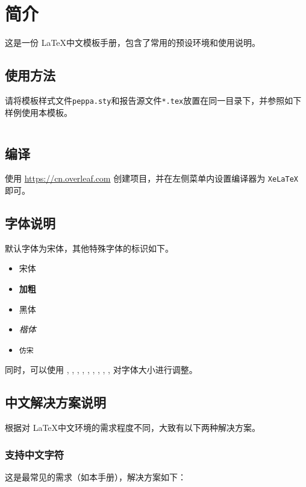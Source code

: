 \section{简介}

这是一份 \LaTeX 中文模板手册，包含了常用的预设环境和使用说明。

\subsection{使用方法}

请将模板样式文件\texttt{peppa.sty}和报告源文件\texttt{*.tex}放置在同一目录下，并参照如下样例使用本模板。

\inputminted{latex}{src/template-usage.tex}

\subsection{编译}
使用 \url{https://cn.overleaf.com} 创建项目，并在左侧菜单内设置编译器为 \texttt{XeLaTeX} 即可。

\subsection{字体说明}
默认字体为宋体，其他特殊字体的标识如下。

\begin{itemize}
    \item \textrm{宋体} \latex{\textrm}
    \item \textbf{加粗} \latex{\textbf}
    \item \textsf{黑体} \latex{\textsf}
    \item \textit{楷体} \latex{\textit} \latex{\emph}
    \item \texttt{仿宋} \latex{\texttt}
\end{itemize}

同时，可以使用 \latex{\tiny}, \latex{\scriptsize}, \latex{\footnotesize}, \latex{\small}, \latex{\normalsize}, \latex{\large}, \latex{\Large}, \latex{\LARGE}, \latex{\huge}, \latex{\Huge} 对字体大小进行调整。

\subsection{中文解决方案说明}
根据对 \LaTeX 中文环境的需求程度不同，大致有以下两种解决方案。

\subsubsection{支持中文字符}
这是最常见的需求（如本手册），解决方案如下：

